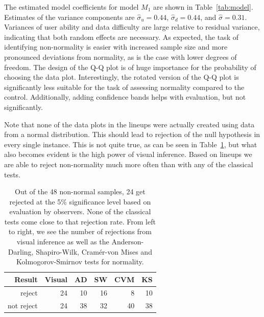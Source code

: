 \documentclass{article}\usepackage[]{graphicx}\usepackage[]{color}
\begin{document}
The estimated model coefficients for model $M_1$ are shown in Table~\ref{tab:model}. 
Estimates of the variance components are $\widehat{\sigma}_u = 0.44$, $\widehat{\sigma}_d=0.44$, and $\widehat{\sigma} = 0.31$. Variances of user ability and data difficulty are large relative to residual variance, indicating that both random effects are necessary.
%
As expected, the task of identifying non-normality is easier with increased sample size and more pronounced deviations from normality, as is the case with lower degrees of freedom. The  design of the Q-Q plot is of huge importance for the probability of choosing the data plot. Interestingly, the rotated version of the Q-Q plot is significantly less suitable for the task of assessing normality compared to the control. Additionally, adding confidence bands helps with evaluation, but not significantly. 

Note that none of the data plots in the lineups were actually created using data from a normal distribution. This should lead to rejection of the null hypothesis in every single instance. This is not quite true, as can be seen in Table~\ref{tab:reject}, but what also becomes evident is the high power  of visual inference. Based on lineups we are able to reject non-normality much more often than with any of the classical tests.

\begin{table}[ht]
\centering
\caption{\label{tab:reject} 
Out of the 48 non-normal samples, 24 get rejected at the 5\% significance level based on evaluation by observers. None of the classical tests come close to that rejection rate. From left to right, we see the number of rejections from visual inference as well as the Anderson-Darling, Shapiro-Wilk, Cram\'er-von Mises and Kolmogorov-Smirnov tests for normality.}
\begin{tabular}{rrrrrr}
  \hline
Result & Visual & AD & SW & CVM & KS \\ 
  \hline
  reject & 24 & 10 & 16 &  8 & 10 \\ 
  not reject & 24 & 38 & 32 & 40 & 38 \\ 
   \hline
\end{tabular}
\end{table}
\end{document}
